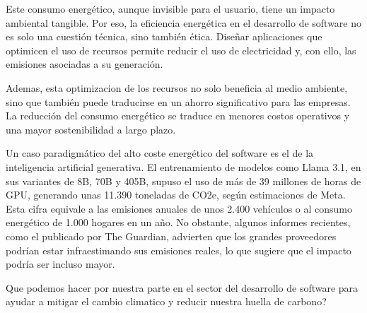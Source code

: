 \documentclass[12pt,a4paper]{report}
\begin{document}
Este consumo energético, aunque invisible para el usuario, tiene un impacto
ambiental tangible. Por eso, la eficiencia energética en el desarrollo de
software no es solo una cuestión técnica, sino también ética. Diseñar
aplicaciones que optimicen el uso de recursos permite reducir el uso de
electricidad y, con ello, las emisiones asociadas a su generación.

Ademas, esta optimizacion de los recursos no solo beneficia al medio ambiente,
sino que también puede traducirse en un ahorro significativo para las empresas.
La reducción del consumo energético se traduce en menores costos operativos y
una mayor sostenibilidad a largo plazo.

Un caso paradigmático del alto coste energético del software es el de la
inteligencia artificial generativa. El entrenamiento de modelos como Llama 3.1,
en sus variantes de 8B, 70B y 405B, supuso el uso de más de 39 millones de
horas de GPU, generando unas 11.390 toneladas de CO2e, según estimaciones de
Meta. Esta cifra equivale a las emisiones anuales de unos 2.400 vehículos o al
consumo energético de 1.000 hogares en un año. No obstante, algunos informes
recientes, como el publicado por The Guardian, advierten que los grandes
proveedores podrían estar infraestimando sus emisiones reales, lo que sugiere
que el impacto podría ser incluso mayor.

Que podemos hacer por nuestra parte en el sector del desarrollo de software
para ayudar a mitigar el cambio climatico y reducir nuestra huella de carbono?
\end{document}
